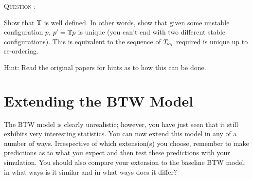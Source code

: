 \documentclass[
  a4paper,             %
  11pt,                %
  oneside,             %
  onecolumn,           %
  bibliography=totoc,  %
  final,               %
]{scrartcl}
\newcounter{question}
\newenvironment{question}{%
  \stepcounter{question}%
  \begin{tcolorbox}[
      colframe=black,
      sharp corners=all,
      boxsep=0.5ex,
    ]
    \noindent\textsc{\large Question \arabic{question}:} %
}{%
  \end{tcolorbox}%
}
\begin{document}
\begin{question}
  Show that \(\mathbb{T}\) is well defined.  In other words, show that given some
  unstable configuration \(p\), \(p' = \mathbb{T} p\) is unique (you can't end with
  two different stable configurations).  This is equivalent to the sequence of
  \(T_{\boldsymbol{x}_{i}}\) required is unique up to re-ordering.

  Hint: Read the original papers for hints as to how this can be done.
\end{question}

\section{Extending the \gls{BTW} Model}
\label{sec:extending_the_btw_model}

The \gls{BTW} model is clearly unrealistic; however, you have just seen that it
still exhibits very interesting statistics.  You can now extend this model in
any of a number of ways.  Irrespective of which extension(s) you choose,
remember to make predictions as to what you expect and then test these
predictions with your simulation.  You should also compare your extension to the
baseline \gls{BTW} model: in what ways is it similar and in what ways does it
differ?
\end{document}
